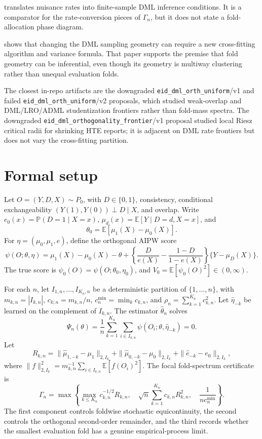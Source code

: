 \documentclass[11pt]{article}
\newcommand{\E}{\mathbb{E}}
\renewcommand{\Pr}{\mathbb{P}}
\theoremstyle{definition}
\theoremstyle{plain}
\theoremstyle{remark}
\begin{document}
\citet{ChernozhukovNeweySingh2023FiniteSampleDML} translates nuisance rates into finite-sample DML inference conditions. It is a comparator for the rate-conversion pieces of \(\Gamma_n\), but it does not state a fold-allocation phase diagram.

\citet{ChiangKatoMaSasaki2022MultiwayDML} shows that changing the DML sampling geometry can require a new cross-fitting algorithm and variance formula. That paper supports the premise that fold geometry can be inferential, even though its geometry is multiway clustering rather than unequal evaluation folds.

The closest in-repo artifacts are the downgraded \texttt{eid\_dml\_orth\_uniform}/v1 and failed \texttt{eid\_dml\_orth\_uniform}/v2 proposals, which studied weak-overlap and DML/LRO/ADML studentization frontiers rather than fold-mass spectra. The downgraded \texttt{eid\_dml\_orthogonality\_frontier}/v1 proposal studied local Riesz critical radii for shrinking HTE reports; it is adjacent on DML rate frontiers but does not vary the cross-fitting partition.

\section{Formal setup}
Let \(O=(Y,D,X)\sim P_0\), with \(D\in\{0,1\}\), consistency, conditional exchangeability \((Y(1),Y(0))\perp D\mid X\), and overlap. Write \(e_0(x)=\Pr(D=1\mid X=x)\), \(\mu_d(x)=\E[Y\mid D=d,X=x]\), and
\[
  \theta_0=\E[\mu_1(X)-\mu_0(X)].
\]
For \(\eta=(\mu_0,\mu_1,e)\), define the orthogonal AIPW score
\[
  \psi(O;\theta,\eta)=\mu_1(X)-\mu_0(X)-\theta+
  \left\{\frac{D}{e(X)}-\frac{1-D}{1-e(X)}\right\}\{Y-\mu_D(X)\}.
\]
The true score is \(\psi_0(O)=\psi(O;\theta_0,\eta_0)\), and \(V_0=\E[\psi_0(O)^2]\in(0,\infty)\).

For each \(n\), let \(I_{1,n},\ldots,I_{K_n,n}\) be a deterministic partition of \(\{1,\ldots,n\}\), with \(m_{k,n}=|I_{k,n}|\), \(c_{k,n}=m_{k,n}/n\), \(c_n^{\min}=\min_k c_{k,n}\), and \(\rho_n=\sum_{k=1}^{K_n}c_{k,n}^2\). Let \(\hat\eta_{-k}\) be learned on the complement of \(I_{k,n}\). The estimator \(\hat\theta_n\) solves
\[
  \Psi_n(\theta)=\frac{1}{n}\sum_{k=1}^{K_n}\sum_{i\in I_{k,n}}
  \psi(O_i;\theta,\hat\eta_{-k})=0.
\]
Let
\[
  R_{k,n}=\|\hat\mu_{1,-k}-\mu_1\|_{2,I_k}+\|\hat\mu_{0,-k}-\mu_0\|_{2,I_k}+\|
  \hat e_{-k}-e_0\|_{2,I_k},
\]
where \(\|f\|_{2,I_k}^2=m_{k,n}^{-1}\sum_{i\in I_{k,n}}\E[f(O_i)^2]\). The focal fold-spectrum certificate is
\[
  \Gamma_n=\max\left\{
  \max_{k\le K_n}c_{k,n}^{-1/2}R_{k,n},\quad
  \sqrt n\sum_{k=1}^{K_n}c_{k,n}R_{k,n}^2,
  \quad \frac{1}{n c_n^{\min}}
  \right\}.
\]
The first component controls foldwise stochastic equicontinuity, the second controls the orthogonal second-order remainder, and the third records whether the smallest evaluation fold has a genuine empirical-process limit.
\end{document}
